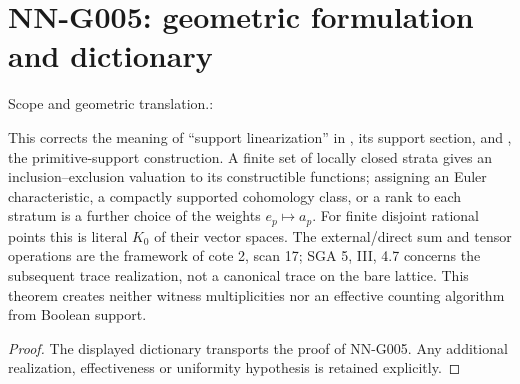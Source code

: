 \section{NN-G005: geometric formulation and dictionary}
\begin{geometricstatement}[NN-G005]
Scope and geometric translation.:

This corrects the meaning of ``support linearization'' in
, its support section,
and , the
primitive-support construction. A finite set of locally closed
strata gives an inclusion--exclusion valuation to its constructible
functions; assigning an Euler characteristic, a compactly supported
cohomology class, or a rank to each stratum is a further choice of
the weights $e_p\mapsto a_p$. For finite disjoint rational points
this is literal $K_0$ of their vector spaces. The external/direct
sum and tensor operations are the framework of cote 2, scan 17;
SGA 5, III, 4.7 concerns the subsequent trace realization, not a
canonical trace on the bare lattice. This theorem creates neither
witness multiplicities nor an effective counting algorithm from
Boolean support.


\end{geometricstatement}
\begin{proof} The displayed dictionary transports the proof of NN-G005. Any additional realization, effectiveness or uniformity hypothesis is retained explicitly.\end{proof}


